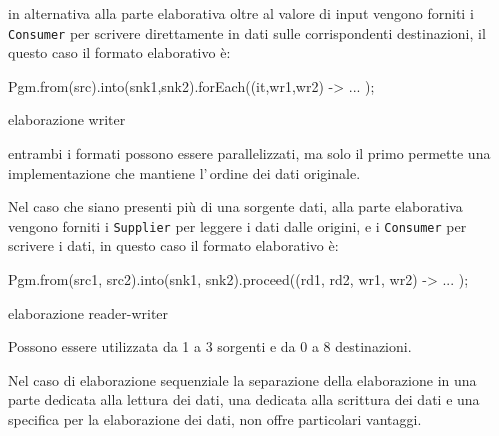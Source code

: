 in alternativa alla parte elaborativa oltre al valore di input vengono forniti i
\texttt{Consumer} per scrivere direttamente in dati sulle corrispondenti
destinazioni, il questo caso il formato elaborativo è:
\begin{elisting}[!htb]
\begin{javacode}
    Pgm.from(src).into(snk1,snk2).forEach((it,wr1,wr2) -> { ... });
\end{javacode}
\caption{elaborazione writer}
\label{lst:processWriter}
\end{elisting}
entrambi i formati possono essere parallelizzati, ma solo il primo permette una
implementazione che mantiene l'\,ordine dei dati originale.

Nel caso che siano presenti più di una sorgente dati, alla parte elaborativa
vengono forniti i \texttt{Supplier} per leggere i dati dalle origini, e i
\texttt{Consumer} per scrivere i dati, in questo caso il formato elaborativo è:
\begin{elisting}[!htb]
\begin{javacode}
    Pgm.from(src1, src2).into(snk1, snk2).proceed((rd1, rd2, wr1, wr2) -> { ... });
\end{javacode}
\caption{elaborazione reader-writer}
\label{lst:pullProcess}
\end{elisting}


Possono essere utilizzata da 1 a 3 sorgenti e da 0 a 8 destinazioni.

Nel caso di elaborazione sequenziale la separazione della elaborazione in una
parte dedicata alla lettura dei dati, una dedicata alla scrittura dei dati e una
specifica per la elaborazione dei dati, non offre particolari vantaggi.

